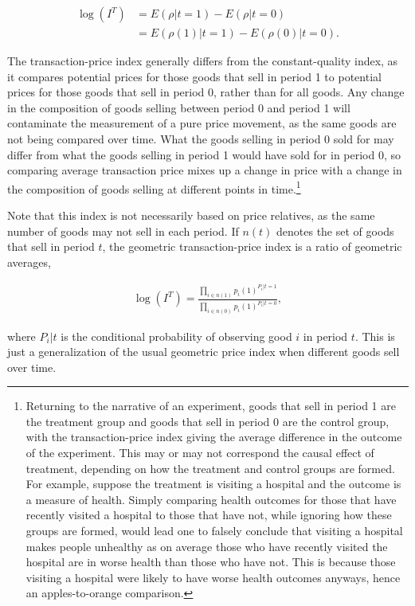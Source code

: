 \documentclass[]{article}
\begin{document}
\begin{align*}
\log(I^{T}) &= E(\rho | t = 1) - E(\rho | t = 0) \\
&= E(\rho(1) | t = 1) - E(\rho(0) | t = 0).
\end{align*}

The transaction-price index generally differs from the constant-quality index, as it compares potential prices for those goods that sell in period 1 to potential prices for those goods that sell in period 0, rather than for all goods. Any change in the composition of goods selling between period 0 and period 1 will contaminate the measurement of a pure price movement, as the same goods are not being compared over time. What the goods selling in period 0 sold for may differ from what the goods selling in period 1 would have sold for in period 0, so comparing average transaction price mixes up a change in price with a change in the composition of goods selling at different points in time.\footnote{Returning to the narrative of an experiment, goods that sell in period 1 are the treatment group and goods that sell in period 0 are the control group, with the transaction-price index giving the average difference in the outcome of the experiment. This may or may not correspond the causal effect of treatment, depending on how the treatment and control groups are formed. For example, suppose the treatment is visiting a hospital and the outcome is a measure of health. Simply comparing health outcomes for those that have recently visited a hospital to those that have not, while ignoring how these groups are formed, would lead one to falsely conclude that visiting a hospital makes people unhealthy as on average those who have recently visited the hospital are in worse health than those who have not. This is because those visiting a hospital were likely to have worse health outcomes anyways, hence an apples-to-orange comparison.}

Note that this index is not necessarily based on price relatives, as the same number of goods may not sell in each period. If \(n(t)\) denotes the set of goods that sell in period \(t\), the geometric transaction-price index is a ratio of geometric averages,

\begin{align*}
\log(I^{T}) = \frac{\prod_{i \in n(1)} p_{i}(1)^{P_{i}|t = 1}}{\prod_{i \in n(0)} p_{i}(1)^{P_{i}|t = 0}},
\end{align*}

where \(P_{i} | t\) is the conditional probability of observing good \(i\) in period \(t\). This is just a generalization of the usual geometric price index when different goods sell over time.
\end{document}
